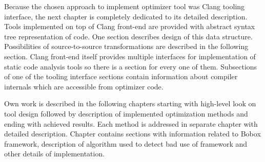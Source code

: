 Because the chosen approach to implement optimizer tool was Clang tooling interface, the next chapter is completely dedicated to its detailed description. Tools implemented on top of Clang front-end are provided with abstract syntax tree representation of code. One section describes design of this data structure. Possibilities of source-to-source transformations are described in the following section. Clang front-end itself provides multiple interfaces for implementation of static code analysis tools so there is a section for every one of them. Subsections of one of the tooling interface sections contain information about compiler internals which are accessible from optimizer code.

Own work is described in the following chapters starting with high-level look on tool design followed by description of implemented optimization methods and ending with achieved results. Each method is addressed in separate chapter with detailed description. Chapter contains sections with information related to Bobox framework, description of algorithm used to detect bad use of framework and other details of implementation.